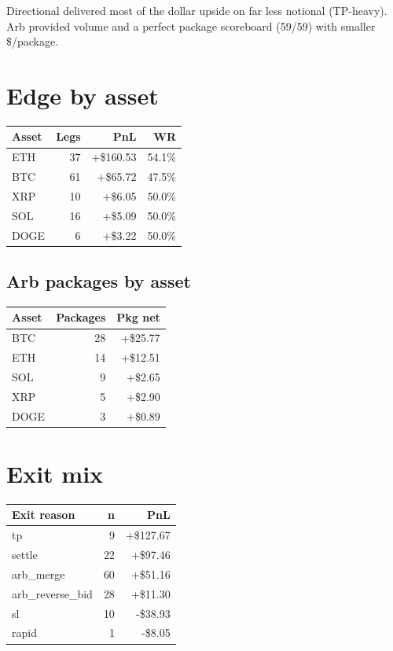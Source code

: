 \documentclass[11pt,a4paper]{article}
\begin{document}
\noindent
Directional delivered most of the dollar upside on far less notional (TP-heavy).
Arb provided volume and a perfect package scoreboard (59/59) with smaller \$/package.

\section{Edge by asset}
\begin{table}[h]
\centering
\begin{tabular}{@{}lrrr@{}}
\toprule
\textbf{Asset} & \textbf{Legs} & \textbf{PnL} & \textbf{WR} \\
\midrule
ETH & 37 & +\$160.53 & 54.1\% \\
BTC & 61 & +\$65.72 & 47.5\% \\
XRP & 10 & +\$6.05 & 50.0\% \\
SOL & 16 & +\$5.09 & 50.0\% \\
DOGE & 6 & +\$3.22 & 50.0\% \\
\bottomrule
\end{tabular}
\end{table}

\subsection{Arb packages by asset}
\begin{table}[h]
\centering
\begin{tabular}{@{}lrr@{}}
\toprule
\textbf{Asset} & \textbf{Packages} & \textbf{Pkg net} \\
\midrule
BTC & 28 & +\$25.77 \\
ETH & 14 & +\$12.51 \\
SOL & 9 & +\$2.65 \\
XRP & 5 & +\$2.90 \\
DOGE & 3 & +\$0.89 \\
\bottomrule
\end{tabular}
\end{table}

\section{Exit mix}
\begin{table}[h]
\centering
\begin{tabular}{@{}lrr@{}}
\toprule
\textbf{Exit reason} & \textbf{n} & \textbf{PnL} \\
\midrule
tp & 9 & +\$127.67 \\
settle & 22 & +\$97.46 \\
arb\_merge & 60 & +\$51.16 \\
arb\_reverse\_bid & 28 & +\$11.30 \\
sl & 10 & -\$38.93 \\
rapid & 1 & -\$8.05 \\
\bottomrule
\end{tabular}
\end{table}
\end{document}
